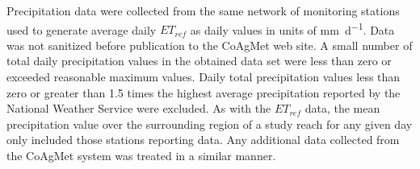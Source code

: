 \begin{linenumbers}
Precipitation data were collected from the same network of monitoring stations used to generate average daily $ET_{ref}$ as daily values in units of \si{\milli\meter\per\day}.  Data was not sanitized before publication to the CoAgMet web site.  A small number of total daily precipitation values in the obtained data set were less than zero or exceeded reasonable maximum values.   Daily total precipitation values less than zero or greater than 1.5 times the highest average precipitation reported by the National Weather Service were excluded.  As with the $ET_{ref}$ data, the mean precipitation value over the surrounding region of a study reach for any given day only included those stations reporting data.  Any additional data collected from the CoAgMet system was treated in a similar manner.
\clearpage{}

\end{linenumbers}